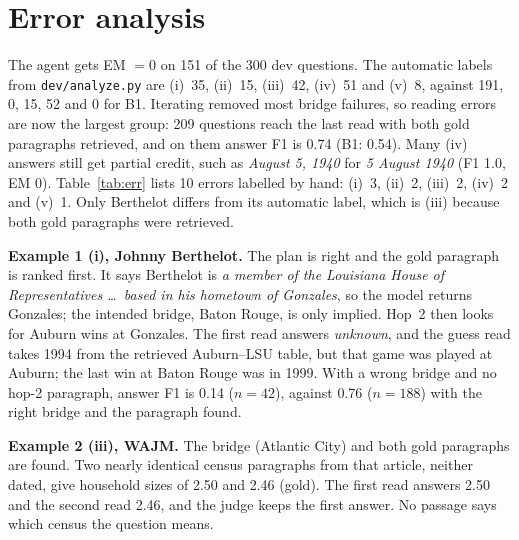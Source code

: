 \documentclass[10pt,a4paper]{article}
\begin{document}
\section{Error analysis}
The agent gets EM $=0$ on 151 of the 300 dev questions. The automatic labels from \texttt{dev/analyze.py} are
(i)~35, (ii)~15, (iii)~42, (iv)~51 and (v)~8, against 191, 0, 15, 52 and 0 for B1. Iterating removed most bridge
failures, so reading errors are now the largest group: 209 questions reach the last read with both gold paragraphs
retrieved, and on them answer F1 is 0.74 (B1: 0.54). Many (iv) answers still get partial credit, such as
\emph{August 5, 1940} for \emph{5 August 1940} (F1 1.0, EM 0). Table~\ref{tab:err} lists 10 errors labelled by hand:
(i)~3, (ii)~2, (iii)~2, (iv)~2 and (v)~1. Only Berthelot differs from its automatic label, which is (iii) because
both gold paragraphs were retrieved.

\textbf{Example 1 (i), Johnny Berthelot.} The plan is right and the gold paragraph is ranked first. It says
Berthelot is \emph{a member of the Louisiana House of Representatives \dots\ based in his hometown of Gonzales}, so
the model returns Gonzales; the intended bridge, Baton Rouge, is only implied. Hop~2 then looks for Auburn wins at
Gonzales. The first read answers \emph{unknown}, and the guess read takes 1994 from the retrieved Auburn--LSU table,
but that game was played at Auburn; the last win at Baton Rouge was in 1999. With a wrong bridge and no hop-2
paragraph, answer F1 is 0.14 ($n{=}42$), against 0.76 ($n{=}188$) with the right bridge and the paragraph found.

\textbf{Example 2 (iii), WAJM.} The bridge (Atlantic City) and both gold paragraphs are found. Two nearly identical
census paragraphs from that article, neither dated, give household sizes of 2.50 and 2.46 (gold). The first read
answers 2.50 and the second read 2.46, and the judge keeps the first answer. No passage says which census the
question means.
\end{document}
